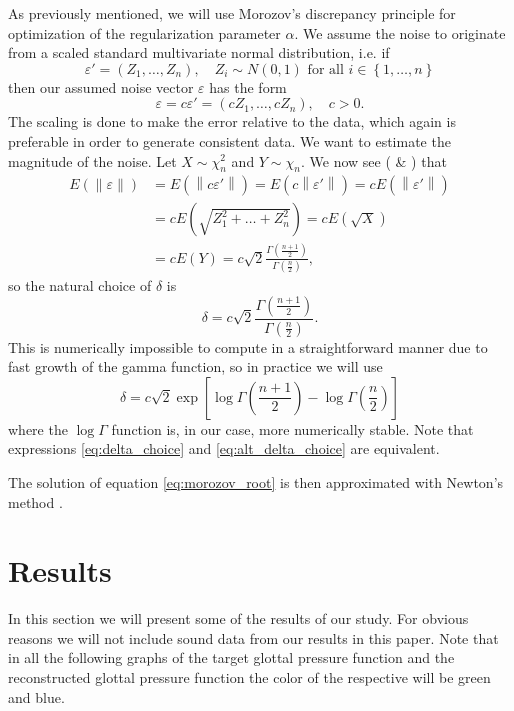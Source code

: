 \documentclass[12pt,a4]{article}
\newcommand{\lnorm}{\left\|}
\newcommand{\rnorm}{\right\|}
\newcommand{\eps}{\ensuremath{\varepsilon}}
\begin{document}
As previously mentioned, we will use Morozov's discrepancy principle for optimization of the regularization parameter $\alpha$. We assume the noise to originate from a scaled standard multivariate normal distribution, i.e. if
\begin{equation}
\eps' = \left(Z_1, \ldots, Z_n \right), \quad Z_i \sim N(0,1) \text{ for all }
i \in \left\{1, \ldots, n\right\}
\end{equation}
then our assumed noise vector $\eps$ has the form
\begin{equation}
\eps = c\eps' = \left(cZ_1, \ldots, cZ_n \right), \quad c > 0.
\end{equation}
The scaling is done to make the error relative to the data, which again is preferable in order to generate consistent data. We want to estimate the magnitude of the noise. Let $X \sim \chi_n^2$ and $Y \sim \chi_n$. We now see (\cite{chi} \& \cite{handbook}) that
\begin{align*}
E\left(\lnorm \eps \rnorm \right)   &= E\left(\lnorm c\eps' \rnorm \right)   =
E\left(c \lnorm \eps' \rnorm \right) = c E\left(\lnorm \eps' \rnorm \right) \\
&= c E\left(\sqrt{Z_1^2 + \ldots + Z_n^2} \right) = c E\left(\sqrt{X} \right) \\
&= c E\left( Y \right) = 
c \sqrt{2}\frac{\Gamma\left(\frac{n+1}{2}\right)}{\Gamma\left(\frac{n}{2}\right)},  
\end{align*}
so the natural choice of $\delta$ is
\begin{equation}\label{eq:delta_choice}
\delta = c \sqrt{2}\frac{\Gamma\left(\frac{n+1}{2}\right)}{\Gamma\left(\frac{n}{2}\right)}.
\end{equation}
This is numerically impossible to compute in a straightforward manner due to fast growth of the gamma function, so in practice we will use 
\begin{equation}\label{eq:alt_delta_choice}
\delta = c\sqrt{2} \exp\left[
\log\Gamma\left(\frac{n+1}{2}\right) -  \log\Gamma\left(\frac{n}{2}\right) \right]  
\end{equation}
where the $\log\Gamma$ function is, in our case, more numerically stable. Note that expressions \eqref{eq:delta_choice} and \eqref{eq:alt_delta_choice} are equivalent.
 
The solution of equation \eqref{eq:morozov_root} is then approximated with Newton's method \cite{NR}.



\section{Results}\label{sec:results}
In this section we will present some of the results of our study. For obvious reasons we will not include sound data from our results in this paper. Note that in all the following graphs of the target glottal pressure function and the reconstructed glottal pressure function the color of the respective will be green and blue.
\end{document}
